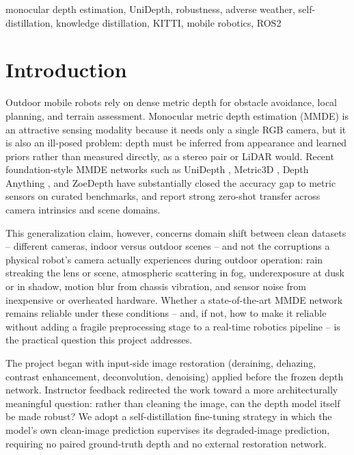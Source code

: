 \documentclass[conference]{IEEEtran}
\begin{document}
\begin{IEEEkeywords}
monocular depth estimation, UniDepth, robustness, adverse weather, self-distillation, knowledge distillation, KITTI, mobile robotics, ROS2
\end{IEEEkeywords}

\section{Introduction}

Outdoor mobile robots rely on dense metric depth for obstacle avoidance, local planning, and terrain assessment. Monocular metric depth estimation (MMDE) is an attractive sensing modality because it needs only a single RGB camera, but it is also an ill-posed problem: depth must be inferred from appearance and learned priors rather than measured directly, as a stereo pair or LiDAR would. Recent foundation-style MMDE networks such as UniDepth \cite{ref1}, Metric3D \cite{ref4}, Depth Anything \cite{ref5}, and ZoeDepth \cite{ref3} have substantially closed the accuracy gap to metric sensors on curated benchmarks, and report strong zero-shot transfer across camera intrinsics and scene domains.

This generalization claim, however, concerns domain shift between clean datasets -- different cameras, indoor versus outdoor scenes -- and not the corruptions a physical robot's camera actually experiences during outdoor operation: rain streaking the lens or scene, atmospheric scattering in fog, underexposure at dusk or in shadow, motion blur from chassis vibration, and sensor noise from inexpensive or overheated hardware. Whether a state-of-the-art MMDE network remains reliable under these conditions -- and, if not, how to make it reliable without adding a fragile preprocessing stage to a real-time robotics pipeline -- is the practical question this project addresses.

The project began with input-side image restoration (deraining, dehazing, contrast enhancement, deconvolution, denoising) applied before the frozen depth network. Instructor feedback redirected the work toward a more architecturally meaningful question: rather than cleaning the image, can the depth model itself be made robust? We adopt a self-distillation fine-tuning strategy in which the model's own clean-image prediction supervises its degraded-image prediction, requiring no paired ground-truth depth and no external restoration network.
\end{document}

